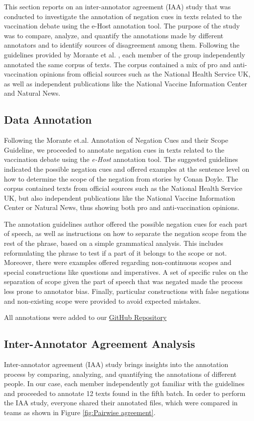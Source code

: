 This section reports on an inter-annotator agreement (IAA) study that was conducted to investigate the annotation of negation cues in texts related to the vaccination debate using the e-Host annotation tool. The purpose of the study was to compare, analyze, and quantify the annotations made by different annotators and to identify sources of disagreement among them. Following the guidelines provided by Morante et al. \cite{morante2011annotation}, each member of the group independently annotated the same corpus of texts. The corpus contained a mix of pro and anti-vaccination opinions from official sources such as the National Health Service UK, as well as independent publications like the National Vaccine Information Center and Natural News. 


\subsection*{Data Annotation}
Following the Morante et.al. \cite{morante2011annotation} Annotation of Negation Cues and their Scope Guideline, we proceeded to annotate negation cues in texts related to the vaccination debate using the \textit{e-Host} annotation tool. The suggested guidelines indicated the possible negation cues and offered examples at the sentence level on how to determine the scope of the negation from stories by Conan Doyle.  The corpus contained texts from official sources such as the National Health Service UK, but also independent publications like the National Vaccine Information Center or Natural News, thus showing both pro and anti-vaccination opinions. 

The annotation guidelines author offered the possible negation cues for each part of speech, as well as instructions on how to separate the negation scope from the rest of the phrase, based on a simple grammatical analysis. This includes reformulating the phrase to test if a part of it belongs to the scope or not. Moreover, there were examples offered regarding non-continuous scopes and special constructions like questions and imperatives. A set of specific rules on the separation of scope given the part of speech that was negated made the process less prone to annotator bias.
Finally, particular constructions with false negations and non-existing scope were provided to avoid expected mistakes.

All annotations were added to our \href{https://github.com/Sergi095/Applied-Text-Mining-VU-Course-2023-}{GitHub Repository}

\subsection*{Inter-Annotator Agreement Analysis}
Inter-annotator agreement (IAA) study brings insights into the annotation process by comparing, analyzing, and quantifying the annotations of different people. In our case, each member independently got familiar with the guidelines and proceeded to annotate 12 texts found in the fifth batch. In order to perform the IAA study, everyone shared their annotated files, which were compared in teams as shown in Figure \ref{fig:Pairwise agreement}.

